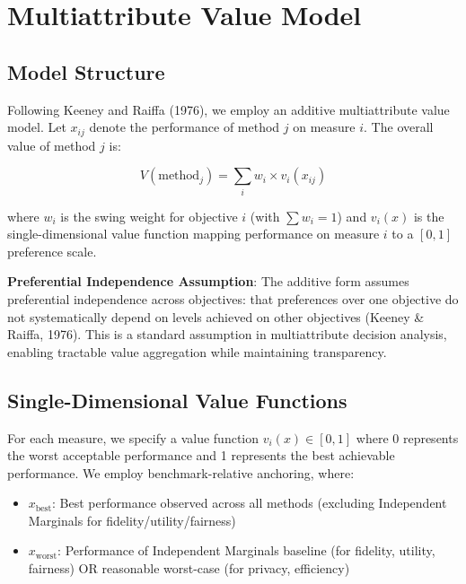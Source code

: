 \documentclass[12pt,a4paper]{article}
\begin{document}
\section{Multiattribute Value Model}

\subsection{Model Structure}

Following Keeney and Raiffa (1976), we employ an additive multiattribute value model. Let $x_{ij}$ denote the performance of method $j$ on measure $i$. The overall value of method $j$ is:

\begin{equation}
V(\text{method}_j) = \sum_i w_i \times v_i(x_{ij})
\end{equation}

where $w_i$ is the swing weight for objective $i$ (with $\sum w_i = 1$) and $v_i(x)$ is the single-dimensional value function mapping performance on measure $i$ to a $[0,1]$ preference scale.

\textbf{Preferential Independence Assumption}: The additive form assumes preferential independence across objectives: that preferences over one objective do not systematically depend on levels achieved on other objectives (Keeney \& Raiffa, 1976). This is a standard assumption in multiattribute decision analysis, enabling tractable value aggregation while maintaining transparency.

\subsection{Single-Dimensional Value Functions}

For each measure, we specify a value function $v_i(x) \in [0,1]$ where 0 represents the worst acceptable performance and 1 represents the best achievable performance. We employ benchmark-relative anchoring, where:
\begin{itemize}
    \item $x_{\text{best}}$: Best performance observed across all methods (excluding Independent Marginals for fidelity/utility/fairness)
    \item $x_{\text{worst}}$: Performance of Independent Marginals baseline (for fidelity, utility, fairness) OR reasonable worst-case (for privacy, efficiency)
\end{itemize}
\end{document}
